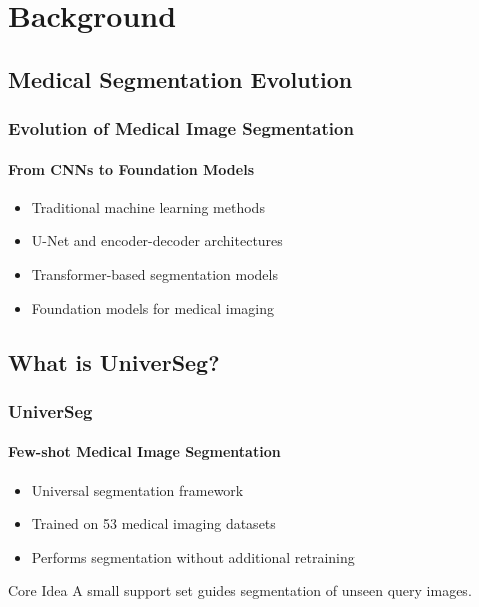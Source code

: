 \documentclass[nometaot,lecture,amberg,autotoc,toc=twocolumn,indicatelastpageofframe,footlinebox]{OTHAWbeamer}
\begin{document}

\section{Background}

\subsection{Medical Segmentation Evolution}

\begin{frame}
    \frametitle{Evolution of Medical Image Segmentation}
    \framesubtitle{From CNNs to Foundation Models}

    \begin{itemize}
        \item Traditional machine learning methods
        \item U-Net and encoder-decoder architectures
        \item Transformer-based segmentation models
        \item Foundation models for medical imaging
    \end{itemize}

    \vspace{1em}


\end{frame}

\subsection{What is UniverSeg?}

\begin{frame}
    \frametitle{UniverSeg}
    \framesubtitle{Few-shot Medical Image Segmentation}

    \begin{itemize}
        \item Universal segmentation framework
        \item Trained on 53 medical imaging datasets
        \item Performs segmentation without additional retraining
    \end{itemize}

    \vspace{1em}

    \begin{block}{Core Idea}
        A small support set guides segmentation of unseen query images.
    \end{block}

\end{frame}
\end{document}
